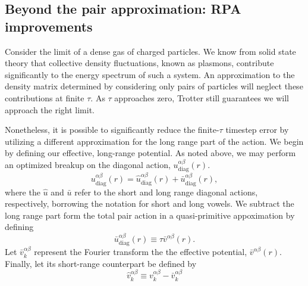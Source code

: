 \documentclass{article}
\begin{document}
\subsection{Beyond the pair approximation: RPA improvements}
Consider the limit of a dense gas of charged particles.  We know from
solid state theory that collective density fluctuations, known as
plasmons, contribute significantly to the energy spectrum of such a system.
An approximation to the density matrix determined by considering only
pairs of particles will neglect these contributions at finite $\tau$.
As $\tau$ approaches zero, Trotter still guarantees we will approach
the right limit.

Nonetheless, it is possible to significantly reduce the finite-$\tau$
timestep error by utilizing a different approximation for the long
range part of the action.  We begin by defining our effective,
long-range potential.  As noted above, we may perform an optimized
breakup on the diagonal action, $u_\text{diag}^{\alpha\beta}(r)$.
\begin{equation}
u_\text{diag}^{\alpha\beta}(r) = \hat{u}^{\alpha\beta}_\text{diag}(r) +
\bar{u}^{\alpha\beta}_\text{diag}(r),
\end{equation}
where the $\hat{u}$ and $\bar{u}$ refer to the short and long range
diagonal actions, respectively, borrowing the notation for short and
long vowels.
We subtract the long range part form the total pair action in a
quasi-primitive appoximation by defining
\begin{equation}
\bar{u}^{\alpha\beta}_\text{diag}(r) \equiv \tau \bar{v}^{\alpha \beta}(r).
\end{equation}
Let $\bar{v}^{\alpha \beta}_k$ represent the Fourier transform the the
effective potential, $\bar{v}^{\alpha\beta}(r)$.  Finally, let its
short-range counterpart be defined by 
\begin{equation}
\hat{v}^{\alpha \beta}_k \equiv v^{\alpha\beta}_k - \bar{v}^{\alpha\beta}_k
\end{equation}
\end{document}

